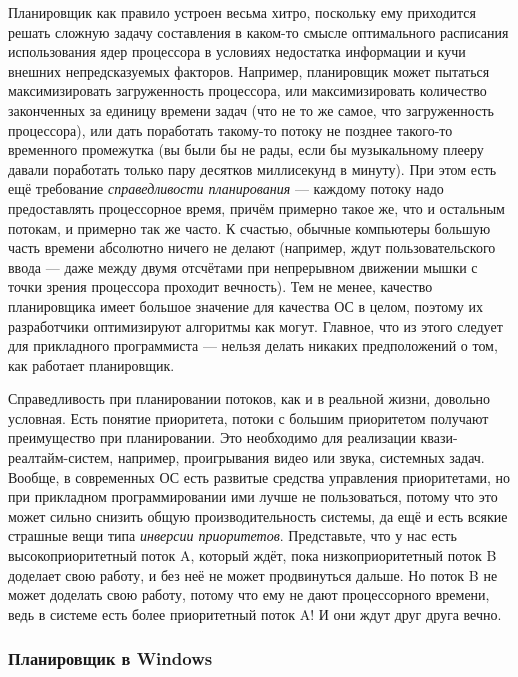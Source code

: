 \documentclass[a5paper]{article}
\begin{document}
Планировщик как правило устроен весьма хитро, поскольку ему приходится решать сложную задачу составления в каком-то смысле оптимального расписания использования ядер процессора в условиях недостатка информации и кучи внешних непредсказуемых факторов. Например, планировщик может пытаться максимизировать загруженность процессора, или максимизировать количество законченных за единицу времени задач (что не то же самое, что загруженность процессора), или дать поработать такому-то потоку не позднее такого-то временного промежутка (вы были бы не рады, если бы музыкальному плееру давали поработать только пару десятков миллисекунд в минуту). При этом есть ещё требование \textit{справедливости планирования} --- каждому потоку надо предоставлять процессорное время, причём примерно такое же, что и остальным потокам, и примерно так же часто. К счастью, обычные компьютеры большую часть времени абсолютно ничего не делают (например, ждут пользовательского ввода --- даже между двумя отсчётами при непрерывном движении мышки с точки зрения процессора проходит вечность). Тем не менее, качество планировщика имеет большое значение для качества ОС в целом, поэтому их разработчики оптимизируют алгоритмы как могут. Главное, что из этого следует для прикладного программиста --- нельзя делать никаких предположений о том, как работает планировщик.

Справедливость при планировании потоков, как и в реальной жизни, довольно условная. Есть понятие приоритета, потоки с большим приоритетом получают преимущество при планировании. Это необходимо для реализации квази-реалтайм-систем, например, проигрывания видео или звука, системных задач. Вообще, в современных ОС есть развитые средства управления приоритетами, но при прикладном программировании ими лучше не пользоваться, потому что это может сильно снизить общую производительность системы, да ещё и есть всякие страшные вещи типа \textit{инверсии приоритетов}. Представьте, что у нас есть высокоприоритетный поток A, который ждёт, пока низкоприоритетный поток B доделает свою работу, и без неё не может продвинуться дальше. Но поток B не может доделать свою работу, потому что ему не дают процессорного времени, ведь в системе есть более приоритетный поток A! И они ждут друг друга вечно.

\subsubsection{Планировщик в Windows}
\end{document}
